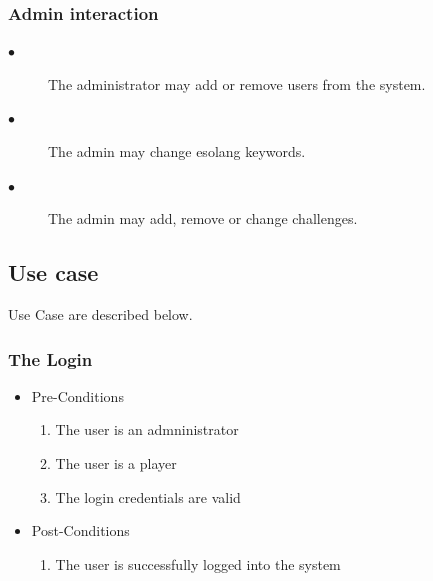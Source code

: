 \documentclass[english]{article}
\begin{document}
		\subsubsection{Admin interaction}
		\begin{description}
			\item[$\bullet$] The administrator may add or remove users from the system.
			\item[$\bullet$] The admin may change esolang keywords.
			\item[$\bullet$] The admin may add, remove or change challenges.
		\end{description}

		
		\subsection{Use case}
		Use Case are described below.
		
		
		
		\subsubsection{The Login}
		\begin{itemize}
	
		
		\item Pre-Conditions
			\begin{enumerate}
				\item The user is an admninistrator
				\item The user is a player
				\item The login credentials are valid
			\end{enumerate}
		\item Post-Conditions
			\begin{enumerate}
			\item The user is successfully logged into the system
						
			\end{enumerate}
		
			
		

\end{itemize}
\end{document}
